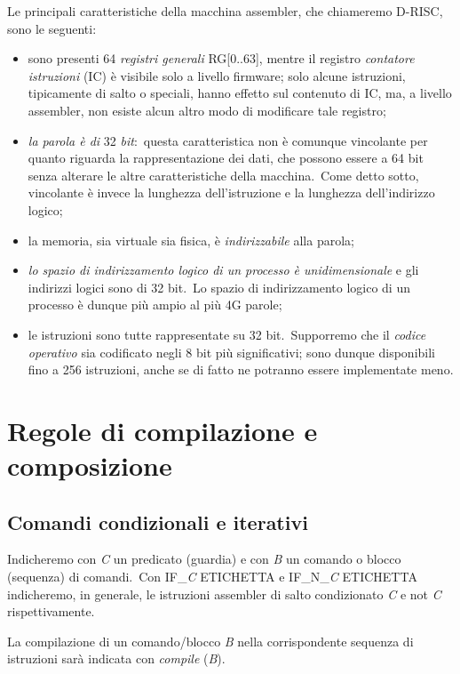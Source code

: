 Le principali caratteristiche della macchina assembler, che chiameremo D-RISC, sono le seguenti:

\begin{itemize}
    \item sono presenti 64 \textit{registri generali} RG[0..63], mentre il registro \textit{contatore istruzioni} (IC) è visibile solo a livello firmware; solo alcune istruzioni, tipicamente di salto o speciali, hanno effetto sul contenuto di IC, ma, a livello assembler, non esiste alcun altro modo di modificare tale registro;
    \item \textit{la parola è di} 32 \textit{bit}:\ questa caratteristica non è comunque vincolante per quanto riguarda la rappresentazione dei dati, che possono essere a 64 bit senza alterare le altre caratteristiche della macchina.\ Come detto sotto, vincolante è invece la lunghezza dell'istruzione e la lunghezza dell'indirizzo logico;
    \item la memoria, sia virtuale sia fisica, è \textit{indirizzabile} alla parola;
    \item \textit{lo spazio di indirizzamento logico di un processo è unidimensionale} e gli indirizzi logici sono di 32 bit.\ Lo spazio di indirizzamento logico di un processo è dunque più ampio al più 4G parole;
    \item le istruzioni sono tutte rappresentate su 32 bit.\ Supporremo che il \textit{codice operativo} sia codificato negli 8 bit più significativi; sono dunque disponibili fino a 256 istruzioni, anche se di fatto ne potranno essere implementate meno.
\end{itemize}

\section{Regole di compilazione e composizione}

\subsection{Comandi condizionali e iterativi}

Indicheremo con \textit{C} un predicato (guardia) e con \textit{B} un comando o blocco (sequenza) di comandi.\ Con IF\_\textit{C} ETICHETTA e IF\_N\_\textit{C} ETICHETTA indicheremo, in generale, le istruzioni assembler di salto condizionato \textit{C} e not \textit{C} rispettivamente.

La compilazione di un comando/blocco \textit{B} nella corrispondente sequenza di istruzioni sarà indicata con \textit{compile} (\textit{B}).

